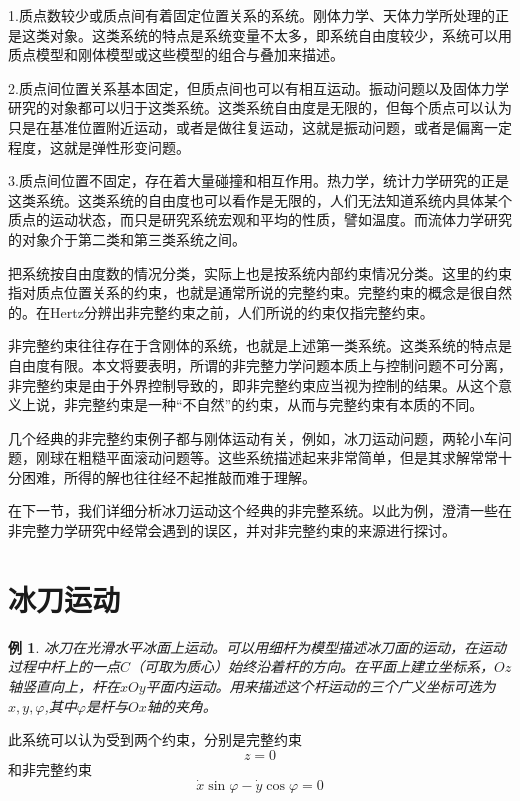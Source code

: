 \documentclass{ctexart}
\begin{document}
1.质点数较少或质点间有着固定位置关系的系统。刚体力学、天体力学所处理的正是这类对象。这类系统的特点是系统变量不太多，即系统自由度较少，系统可以用质点模型和刚体模型或这些模型的组合与叠加来描述。

2.质点间位置关系基本固定，但质点间也可以有相互运动。振动问题以及固体力学研究的对象都可以归于这类系统。这类系统自由度是无限的，但每个质点可以认为只是在基准位置附近运动，或者是做往复运动，这就是振动问题，或者是偏离一定程度，这就是弹性形变问题。

3.质点间位置不固定，存在着大量碰撞和相互作用。热力学，统计力学研究的正是这类系统。这类系统的自由度也可以看作是无限的，人们无法知道系统内具体某个质点的运动状态，而只是研究系统宏观和平均的性质，譬如温度。而流体力学研究的对象介于第二类和第三类系统之间。


把系统按自由度数的情况分类，实际上也是按系统内部约束情况分类。这里的约束指对质点位置关系的约束，也就是通常所说的完整约束。完整约束的概念是很自然的。在Hertz分辨出非完整约束之前，人们所说的约束仅指完整约束。

非完整约束往往存在于含刚体的系统，也就是上述第一类系统。这类系统的特点是自由度有限。本文将要表明，所谓的非完整力学问题本质上与控制问题不可分离，非完整约束是由于外界控制导致的，即非完整约束应当视为控制的结果。从这个意义上说，非完整约束是一种“不自然”的约束，从而与完整约束有本质的不同。

几个经典的非完整约束例子都与刚体运动有关，例如，冰刀运动问题，两轮小车问题，刚球在粗糙平面滚动问题等。这些系统描述起来非常简单，但是其求解常常十分困难，所得的解也往往经不起推敲而难于理解。

在下一节，我们详细分析冰刀运动这个经典的非完整系统。以此为例，澄清一些在非完整力学研究中经常会遇到的误区，并对非完整约束的来源进行探讨。
\section{冰刀运动}
\label{sec:ice}
\newtheorem{example}{例}[section]

\begin{example}
  冰刀在光滑水平冰面上运动。可以用细杆为模型描述冰刀面的运动，在运动过程中杆上的一点$C$（可取为质心）始终沿着杆的方向。在平面上建立坐标系，$Oz$轴竖直向上，杆在$xOy$平面内运动。用来描述这个杆运动的三个广义坐标可选为$x,y,\varphi$,其中$\varphi$是杆与$Ox$轴的夹角。
\end{example}

此系统可以认为受到两个约束，分别是完整约束
\begin{equation}
  \label{eq:ice1}
  z = 0
\end{equation}
和非完整约束
\begin{equation}
  \label{eq:ice2}
  \dot{x} \sin\varphi - \dot{y} \cos\varphi = 0
\end{equation}
\end{document}

